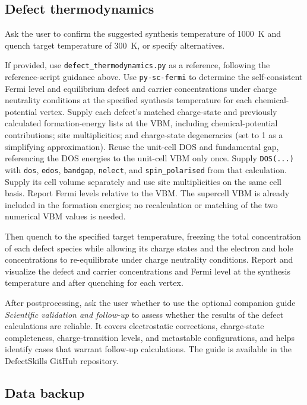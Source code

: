 \documentclass[aip,jap,reprint,amsmath,amssymb]{revtex4-2}
\begin{document}
\subsection{Defect thermodynamics}\label{step:thermodynamics}

Ask the user to confirm the suggested synthesis temperature of 1000~K and quench target temperature of 300~K, or specify alternatives.

If provided, use \texttt{defect\_thermodynamics.py} as a reference, following the reference-script guidance above. Use \texttt{py-sc-fermi}\cite{Squires2023} to determine the self-consistent Fermi level and equilibrium defect and carrier concentrations under charge neutrality conditions at the specified synthesis temperature for each chemical-potential vertex. Supply each defect's matched charge-state and previously calculated formation-energy lists at the VBM, including chemical-potential contributions; site multiplicities; and charge-state degeneracies (set to 1 as a simplifying approximation). Reuse the unit-cell DOS and fundamental gap, referencing the DOS energies to the unit-cell VBM only once. Supply \texttt{DOS(...)} with \texttt{dos}, \texttt{edos}, \texttt{bandgap}, \texttt{nelect}, and \texttt{spin\_polarised} from that calculation. Supply its cell volume separately and use site multiplicities on the same cell basis. Report Fermi levels relative to the VBM. The supercell VBM is already included in the formation energies; no recalculation or matching of the two numerical VBM values is needed.

Then quench to the specified target temperature,\cite{Buckeridge2019} freezing the total concentration of each defect species while allowing its charge states and the electron and hole concentrations to re-equilibrate under charge neutrality conditions. Report and visualize the defect and carrier concentrations and Fermi level at the synthesis temperature and after quenching for each vertex.

After postprocessing, ask the user whether to use the optional companion guide \emph{Scientific validation and follow-up} to assess whether the results of the defect calculations are reliable. It covers electrostatic corrections, charge-state completeness, charge-transition levels, and metastable configurations, and helps identify cases that warrant follow-up calculations. The guide is available in the DefectSkills GitHub repository.

\subsection{Data backup}
\end{document}
